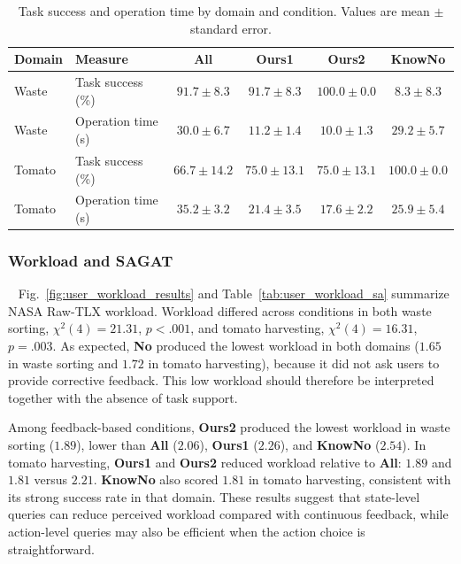 \begin{table}[t]
\centering
\caption{Task success and operation time by domain and condition. Values are mean $\pm$ standard error.}
\label{tab:user_task_time}
\small
\setlength{\tabcolsep}{5pt}
\begin{tabular*}{\textwidth}{@{\extracolsep{\fill}}llcccc}
\toprule
\textbf{Domain} & \textbf{Measure} & \textbf{All} & \textbf{Ours1} & \textbf{Ours2} & \textbf{KnowNo} \\
\midrule
Waste & Task success (\%) & $91.7 \pm 8.3$ & $91.7 \pm 8.3$ & $100.0 \pm 0.0$ & $8.3 \pm 8.3$ \\
Waste & Operation time (s) & $30.0 \pm 6.7$ & $11.2 \pm 1.4$ & $10.0 \pm 1.3$ & $29.2 \pm 5.7$ \\
Tomato & Task success (\%) & $66.7 \pm 14.2$ & $75.0 \pm 13.1$ & $75.0 \pm 13.1$ & $100.0 \pm 0.0$ \\
Tomato & Operation time (s) & $35.2 \pm 3.2$ & $21.4 \pm 3.5$ & $17.6 \pm 2.2$ & $25.9 \pm 5.4$ \\
\bottomrule
\end{tabular*}
\end{table}

\subsubsection{Workload and SAGAT}~\label{user:results_workload_sa}
Fig.~\ref{fig:user_workload_results} and Table~\ref{tab:user_workload_sa} summarize NASA Raw-TLX workload. Workload differed across conditions in both waste sorting, $\chi^2(4)=21.31$, $p<.001$, and tomato harvesting, $\chi^2(4)=16.31$, $p=.003$. As expected, \textbf{No} produced the lowest workload in both domains ($1.65$ in waste sorting and $1.72$ in tomato harvesting), because it did not ask users to provide corrective feedback. This low workload should therefore be interpreted together with the absence of task support.

Among feedback-based conditions, \textbf{Ours2} produced the lowest workload in waste sorting ($1.89$), lower than \textbf{All} ($2.06$), \textbf{Ours1} ($2.26$), and \textbf{KnowNo} ($2.54$). In tomato harvesting, \textbf{Ours1} and \textbf{Ours2} reduced workload relative to \textbf{All}: $1.89$ and $1.81$ versus $2.21$. \textbf{KnowNo} also scored $1.81$ in tomato harvesting, consistent with its strong success rate in that domain. These results suggest that state-level queries can reduce perceived workload compared with continuous feedback, while action-level queries may also be efficient when the action choice is straightforward.

